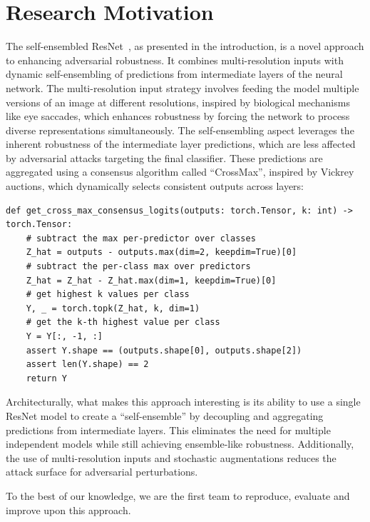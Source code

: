 \documentclass[a4paper, oneside]{discothesis}
\begin{document}
\section{Research Motivation}

The self-ensembled ResNet~\cite{fort2024ensemble}, as presented in the introduction, is a novel approach to enhancing adversarial robustness. It combines multi-resolution inputs with dynamic self-ensembling of predictions from intermediate layers of the neural network. The multi-resolution input strategy involves feeding the model multiple versions of an image at different resolutions, inspired by biological mechanisms like eye saccades, which enhances robustness by forcing the network to process diverse representations simultaneously. The self-ensembling aspect leverages the inherent robustness of the intermediate layer predictions, which are less affected by adversarial attacks targeting the final classifier. These predictions are aggregated using a consensus algorithm called ``CrossMax'', inspired by Vickrey auctions, which dynamically selects consistent outputs across layers:

\begin{spacing}{1}
\begin{verbatim}
def get_cross_max_consensus_logits(outputs: torch.Tensor, k: int) -> torch.Tensor:
    # subtract the max per-predictor over classes
    Z_hat = outputs - outputs.max(dim=2, keepdim=True)[0]
    # subtract the per-class max over predictors
    Z_hat = Z_hat - Z_hat.max(dim=1, keepdim=True)[0]
    # get highest k values per class
    Y, _ = torch.topk(Z_hat, k, dim=1)
    # get the k-th highest value per class
    Y = Y[:, -1, :]
    assert Y.shape == (outputs.shape[0], outputs.shape[2])
    assert len(Y.shape) == 2
    return Y
\end{verbatim}
\end{spacing}

Architecturally, what makes this approach interesting is its ability to use a single ResNet model to create a ``self-ensemble'' by decoupling and aggregating predictions from intermediate layers. This eliminates the need for multiple independent models while still achieving ensemble-like robustness. Additionally, the use of multi-resolution inputs and stochastic augmentations reduces the attack surface for adversarial perturbations.

To the best of our knowledge, we are the first team to reproduce, evaluate and improve upon this approach.
\end{document}

